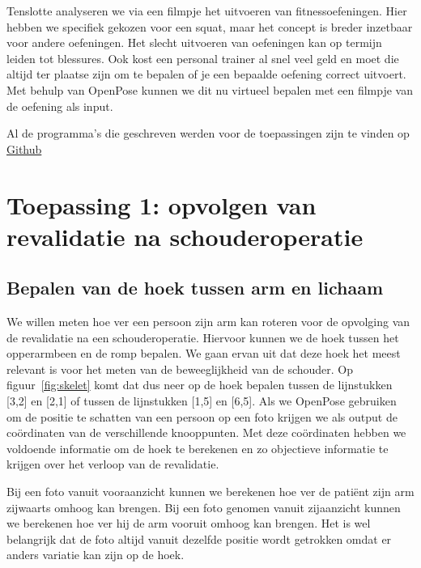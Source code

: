 \documentclass[a4paper,twoside,kulak]{kulakreport}
\begin{document}
Tenslotte analyseren we via een filmpje het uitvoeren van fitnessoefeningen. Hier hebben we specifiek gekozen voor een squat, maar het concept is breder inzetbaar voor andere oefeningen. Het slecht uitvoeren van oefeningen kan op termijn leiden tot blessures. Ook kost een personal trainer al snel veel geld en moet die altijd ter plaatse zijn om te bepalen of je een bepaalde oefening correct uitvoert. Met behulp van OpenPose kunnen we dit nu virtueel bepalen met een filmpje van de oefening als input.

Al de programma's die geschreven werden voor de toepassingen zijn te vinden op \href{https://github.com/isaacvenus/LPB}{Github}

\section{Toepassing 1: opvolgen van revalidatie na schouderoperatie}
\subsection{Bepalen van de hoek tussen arm en lichaam}

We willen meten hoe ver een persoon zijn arm kan roteren voor de opvolging van de revalidatie na een schouderoperatie. Hiervoor kunnen we de hoek tussen het opperarmbeen en de romp bepalen. We gaan ervan uit dat deze hoek het meest relevant is voor het meten van de beweeglijkheid van de schouder. Op figuur~\ref{fig:skelet} komt dat dus neer op de hoek bepalen tussen de lijnstukken [3,2] en [2,1] of tussen de lijnstukken [1,5] en [6,5]. Als we OpenPose gebruiken om de positie te schatten van een persoon op een foto krijgen we als output de coördinaten van de verschillende knooppunten. Met deze coördinaten hebben we voldoende informatie om de hoek te berekenen en zo objectieve informatie te krijgen over het verloop van de revalidatie.

Bij een foto vanuit vooraanzicht kunnen we berekenen hoe ver de patiënt zijn arm zijwaarts omhoog kan brengen. Bij een foto genomen vanuit zijaanzicht kunnen we berekenen hoe ver hij de arm vooruit omhoog kan brengen. Het is wel belangrijk dat de foto altijd vanuit dezelfde positie wordt getrokken omdat er anders variatie kan zijn op de hoek.
\end{document}

